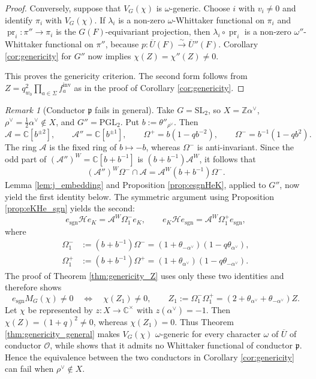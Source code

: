\documentclass[12pt]{article}
\numberwithin{equation}{section}
\theoremstyle{definition}
\theoremstyle{remark}
\newtheorem{remark}[theorem]{Remark}
\theoremstyle{plain}
\begin{document}
\begin{proof}
Conversely, suppose that $V_G(\chi)$ is $\omega$-generic. Choose $i$ with $v_i\neq0$ and identify $\pi_i$ with $V_G(\chi)$. If $\lambda_i$ is a non-zero $\omega$-Whittaker functional on $\pi_i$ and $\operatorname{pr}_i:\pi''\to\pi_i$ is the $G(F)$-equivariant projection, then $\lambda_i\circ\operatorname{pr}_i$ is a non-zero $\omega''$-Whittaker functional on $\pi''$, because $p:\overline U(F)\xrightarrow{\sim}\overline U''(F)$. Corollary \ref{cor:genericity} for $G''$ now implies $\chi(Z)=\chi''(Z)\neq0$.

This proves the genericity criterion. The second form follows from $Z=q_{w_0}^2\prod_{a\in\Sigma}f_a^{\mathrm{inv}}$ as in the proof of Corollary \ref{cor:genericity}.
\end{proof}

\begin{remark}[Conductor $\mathfrak{p}$ fails in general]\label{rem:SL2}
Take $G=\mathrm{SL}_2$, so $X=\mathbb Z\alpha^\vee$, $\rho^\vee=\tfrac12\alpha^\vee\notin X$, and $G''=\mathrm{PGL}_2$. Put $b:=\theta''_{\rho^\vee}$. Then
$$\mathcal A=\mathbb C[b^{\pm2}],\qquad \mathcal A''=\mathbb C[b^{\pm1}],\qquad
\Omega^+=b(1-qb^{-2}),\qquad \Omega^-=b^{-1}(1-qb^2).$$
The ring $\mathcal A$ is the fixed ring of $b\mapsto-b$, whereas $\Omega^-$ is anti-invariant. Since the odd part of $(\mathcal A'')^W=\mathbb C[b+b^{-1}]$ is $(b+b^{-1})\mathcal A^W$, it follows that
$$(\mathcal A'')^W\Omega^-\cap\mathcal A=\mathcal A^W(b+b^{-1})\Omega^-.$$
Lemma \ref{lem:j_embedding} and Proposition \ref{prop:esgnHeK}, applied to $G''$, now yield the first identity below. The symmetric argument using Proposition \ref{prop:eKHe_sgn} yields the second:
$$e_{\mathrm{sgn}}\mathcal He_K=\mathcal A^W\Omega_1^-e_K,\qquad
e_K\mathcal He_{\mathrm{sgn}}=\mathcal A^W\Omega_1^+e_{\mathrm{sgn}},$$
where
\begin{align*}
\Omega_1^-&:=(b+b^{-1})\Omega^-=(1+\theta_{-\alpha^\vee})(1-q\theta_{\alpha^\vee}),\\
\Omega_1^+&:=(b+b^{-1})\Omega^+=(1+\theta_{\alpha^\vee})(1-q\theta_{-\alpha^\vee}).
\end{align*}
The proof of Theorem \ref{thm:genericity_Z} uses only these two identities and therefore shows
$$e_{\mathrm{sgn}}M_G(\chi)\ne0\quad\Longleftrightarrow\quad\chi(Z_1)\ne0,\qquad
Z_1:=\Omega_1^-\Omega_1^+=(2+\theta_{\alpha^\vee}+\theta_{-\alpha^\vee})Z.$$
Let $\chi$ be represented by $z:X\to\mathbb C^\times$ with $z(\alpha^\vee)=-1$. Then $\chi(Z)=(1+q)^2\ne0$, whereas $\chi(Z_1)=0$. Thus Theorem \ref{thm:genericity_general} makes $V_G(\chi)$ $\omega$-generic for every character $\omega$ of $\overline U$ of conductor $\mathcal O$, while \cite[Corollary 5.2]{LuoGCS} shows that it admits no Whittaker functional of conductor $\mathfrak p$. Hence the equivalence between the two conductors in Corollary \ref{cor:genericity} can fail when $\rho^\vee\notin X$.
\end{remark}
\end{document}
